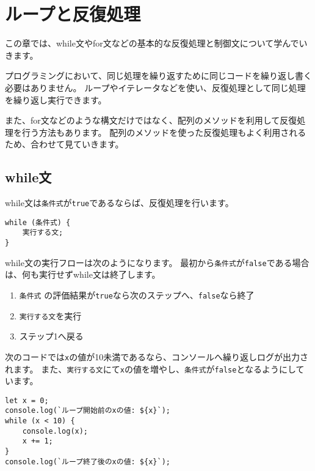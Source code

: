 \hypertarget{loop-and-iteration}{%
\chapter{ループと反復処理}\label{loop-and-iteration}}
\thispagestyle{frontheadings}

この章では、while文やfor文などの基本的な反復処理と制御文について学んでいきます。

プログラミングにおいて、同じ処理を繰り返すために同じコードを繰り返し書く必要はありません。
ループやイテレータなどを使い、反復処理として同じ処理を繰り返し実行できます。

また、for文などのような構文だけではなく、配列のメソッドを利用して反復処理を行う方法もあります。
配列のメソッドを使った反復処理もよく利用されるため、合わせて見ていきます。

\hypertarget{while-statement}{%
\section{while文}\label{while-statement}}

while文は\texttt{条件式}が\texttt{true}であるならば、反復処理を行います。

\begin{lstlisting}
while (条件式) {
    実行する文;
}
\end{lstlisting}

while文の実行フローは次のようになります。
最初から\texttt{条件式}が\texttt{false}である場合は、何も実行せずwhile文は終了します。

\begin{enumerate}
\def\labelenumi{\arabic{enumi}.}
\item
  \texttt{条件式}
  の評価結果が\texttt{true}なら次のステップへ、\texttt{false}なら終了
\item
  \texttt{実行する文}を実行
\item
  ステップ1へ戻る
\end{enumerate}

次のコードでは\texttt{x}の値が10未満であるなら、コンソールへ繰り返しログが出力されます。
また、\texttt{実行する文}にて\texttt{x}の値を増やし、\texttt{条件式}が\texttt{false}となるようにしています。

\begin{lstlisting}
let x = 0;
console.log(`ループ開始前のxの値: ${x}`);
while (x < 10) {
    console.log(x);
    x += 1;
}
console.log(`ループ終了後のxの値: ${x}`);
\end{lstlisting}


